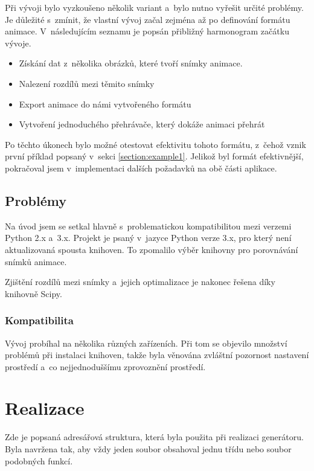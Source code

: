 Při vývoji bylo vyzkoušeno několik variant a~bylo nutno vyřešit určité problémy. Je důležité s~zmínit, že vlastní vývoj začal zejména až po definování formátu animace. V~následujícím seznamu je popsán přibližný harmonogram začátku vývoje.

\begin{itemize}
\item Získání dat z~několika obrázků, které tvoří snímky animace.
\item Nalezení rozdílů mezi těmito snímky
\item Export animace do námi vytvořeného formátu
\item Vytvoření jednoduchého přehrávače, který dokáže animaci přehrát
\end{itemize}

Po těchto úkonech bylo možné otestovat efektivitu tohoto formátu, z~čehož vznik první příklad popsaný v~sekci \ref{section:example1}. Jelikož byl formát efektivnější, pokračoval jsem v~implementaci dalších požadavků na obě části aplikace.

\subsection{Problémy}

Na úvod jsem se setkal hlavně s~problematickou kompatibilitou mezi verzemi Python 2.x a~3.x. Projekt je psaný v~jazyce Python verze 3.x, pro který není aktualizovaná spousta knihoven. To zpomalilo výběr knihovny pro porovnávání snímků animace.

Zjištění rozdílů mezi snímky a~jejich optimalizace je nakonec řešena díky knihovně Scipy.

\subsubsection*{Kompatibilita}

Vývoj probíhal na několika různých zařízeních. Při tom se objevilo množství problémů při instalaci knihoven, takže byla věnována zvláštní pozornost nastavení prostředí a~co nejjednoduššímu zprovoznění prostředí. 



\section{Realizace}
\label{section:genimpl}

Zde je popsaná adresářová struktura, která byla použita při realizaci generátoru. Byla navržena tak, aby vždy jeden soubor obsahoval jednu třídu nebo soubor podobných funkcí.


